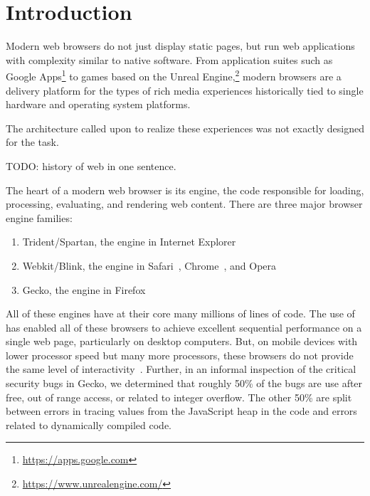 \section{Introduction}
\label{sec:intro}
Modern web browsers do not just display static pages, but run web applications
with complexity similar to native software.
From application suites such as Google Apps\footnote{\url{https://apps.google.com}} to games
based on the Unreal Engine,\footnote{\url{https://www.unrealengine.com/}}
modern browsers are a delivery platform for the types of rich media experiences historically
tied to single hardware and operating system platforms.

The architecture called upon to realize these experiences was not exactly designed for the task.

TODO: history of web in one sentence.

The heart of a modern web browser is its engine, the code responsible
for loading, processing, evaluating, and rendering web content.
There are three major browser engine families:
\begin{enumerate}
\item Trident/Spartan, the engine in Internet Explorer~\cite{IE}
\item Webkit\cite{WEBKIT}/Blink, the engine in Safari~\cite{SAFARI}, Chrome~\cite{CHROME}, and Opera~\cite{OPERA}
\item Gecko, the engine in Firefox~\cite{FIREFOX}
\end{enumerate}
All of these engines have at their core many millions of lines of \Cplusplus{} code.
The use of \Cplusplus{} has enabled all of these browsers to achieve excellent sequential
performance on a single web page, particularly on desktop computers.
But, on mobile devices with lower processor speed but many more processors, these browsers
do not provide the same level of interactivity~\cite{parallelizing-web-pages,ZOOMM}.
Further, in an informal inspection of the critical security bugs in Gecko, we determined that
roughly 50\% of the bugs are use after free, out of range access, or related to integer
overflow.
The other 50\% are split between errors in tracing values from the JavaScript heap in the
\Cplusplus{} code and errors related to dynamically compiled code.


